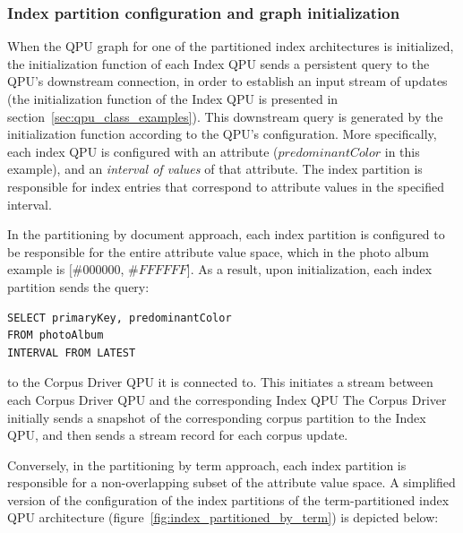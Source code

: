 \subsubsection{Index partition configuration and graph initialization}

When the QPU graph for one of the partitioned index architectures is initialized,
the initialization function of each Index QPU sends a persistent query to the QPU's downstream connection,
in order to establish an input stream of updates (the initialization function of the Index QPU is presented in section~\ref{sec:qpu_class_examples}).
This downstream query is generated by the initialization function according to the QPU's configuration.
More specifically, each index QPU is configured with an attribute ($predominantColor$ in this example),
and an \textit{interval of values} of that attribute.
The index partition is responsible for index entries that correspond to attribute values in the specified interval.

\medskip
\noindent
In the partitioning by document approach,
each index partition is configured to be responsible for the entire attribute value space,
which in the photo album example is $[\#000000$, $\#FFFFFF$].
As a result, upon initialization, each index partition sends the query: 

\begin{lstlisting}[caption={Query sent during initialization from each index partition to the corresponding Corpus Driver QPU,
  in the QPU graph shown in Figure~\ref{fig:index_partitioned_by_document}.}]
SELECT primaryKey, predominantColor
FROM photoAlbum
INTERVAL FROM LATEST
\end{lstlisting}

\noindent
to the Corpus Driver QPU it is connected to.
This initiates a stream between each Corpus Driver QPU and the corresponding Index QPU
The Corpus Driver initially sends a snapshot of the corresponding corpus partition to the
Index QPU, and then sends a stream record for each corpus update.

Conversely, in the partitioning by term approach, each index partition is responsible for a non-overlapping subset of the
attribute value space.
A simplified version of the configuration of the index partitions of the term-partitioned index QPU architecture
(figure~\ref{fig:index_partitioned_by_term}) is depicted below: \\

